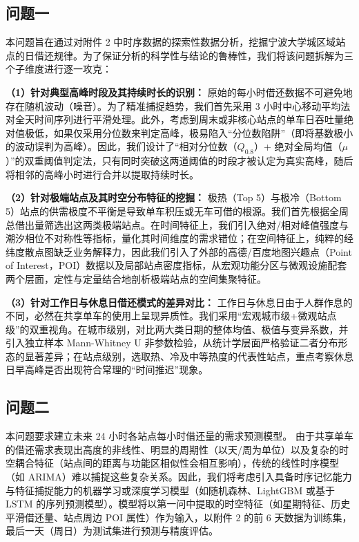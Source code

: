 \documentclass[a4paper, 12pt]{ctexart}
\begin{document}
\subsection{问题一}
本问题旨在通过对附件 2 中时序数据的探索性数据分析，挖掘宁波大学城区域站点的日借还规律。为了保证分析的科学性与结论的鲁棒性，我们将该问题拆解为三个子维度进行逐一攻克：

\textbf{（1）针对典型高峰时段及其持续时长的识别：}
原始的每小时借还数据不可避免地存在随机波动（噪音）。为了精准捕捉趋势，我们首先采用 3 小时中心移动平均法对全天时间序列进行平滑处理。此外，考虑到周末或非核心站点的单车日吞吐量绝对值极低，如果仅采用分位数来判定高峰，极易陷入“分位数陷阱”（即将基数极小的波动误判为高峰）。因此，我们设计了“相对分位数（$Q_{0.8}$）+ 绝对全局均值（$\mu$）”的双重阈值判定法，只有同时突破这两道阈值的时段才被认定为真实高峰，随后将相邻的高峰小时进行合并以提取持续时长。

\textbf{（2）针对极端站点及其时空分布特征的挖掘：}
极热（Top 5）与极冷（Bottom 5）站点的供需极度不平衡是导致单车积压或无车可借的根源。我们首先根据全周总借出量筛选出这两类极端站点。在时间特征上，我们引入绝对/相对峰值强度与潮汐相位不对称性等指标，量化其时间维度的需求错位；在空间特征上，纯粹的经纬度散点图缺乏业务解释力，因此我们引入了外部的高德/百度地图兴趣点（Point of Interest，POI）数据以及局部站点密度指标，从宏观功能分区与微观设施配套两个层面，定性与定量结合地剖析极端站点的空间集聚特征。

\textbf{（3）针对工作日与休息日借还模式的差异对比：}
工作日与休息日由于人群作息的不同，必然在共享单车的使用上呈现异质性。我们采用“宏观城市级+微观站点级”的双重视角。在城市级别，对比两大类日期的整体均值、极值与变异系数，并引入独立样本 Mann-Whitney U 非参数检验，从统计学层面严格验证二者分布形态的显著差异；在站点级别，选取热、冷及中等热度的代表性站点，重点考察休息日早高峰是否出现符合常理的“时间推迟”现象。

\subsection{问题二}
本问题要求建立未来 24 小时各站点每小时借还量的需求预测模型。
由于共享单车的借还需求表现出高度的非线性、明显的周期性（以天/周为单位）以及复杂的时空耦合特征（站点间的距离与功能区相似性会相互影响），传统的线性时序模型（如 ARIMA）难以捕捉这些复杂关系。因此，我们将考虑引入具备时序记忆能力与特征捕捉能力的机器学习或深度学习模型（如随机森林、LightGBM 或基于 LSTM 的序列预测模型）。模型将以第一问中提取的时空特征（如星期特征、历史平滑借还量、站点周边 POI 属性）作为输入，以附件 2 的前 6 天数据为训练集，最后一天（周日）为测试集进行预测与精度评估。
\end{document}
